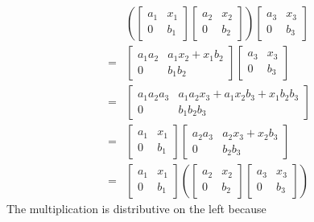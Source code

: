 \begin{align*}
  {}&
  \left(
    \begin{bmatrix}
      a_1 & x_1 \\
      0   & b_1
    \end{bmatrix}
    \begin{bmatrix}
      a_2 & x_2 \\
      0   & b_2
    \end{bmatrix}
  \right)
  \begin{bmatrix}
    a_3 & x_3 \\
    0   & b_3
  \end{bmatrix}
  \\
  ={}&
  \begin{bmatrix}
    a_1 a_2 & a_1 x_2 + x_1 b_2 \\
    0       & b_1 b_2
  \end{bmatrix}
  \begin{bmatrix}
    a_3 & x_3 \\
    0   & b_3
  \end{bmatrix}
  \\
  ={}&
  \begin{bmatrix}
    a_1 a_2 a_3 & a_1 a_2 x_3 + a_1 x_2 b_3 + x_1 b_2 b_3 \\
    0           & b_1 b_2 b_3
  \end{bmatrix}
  \\
  ={}&
  \begin{bmatrix}
      a_1 & x_1 \\
      0   & b_1
  \end{bmatrix}
  \begin{bmatrix}
    a_2 a_3 & a_2 x_3 + x_2 b_3 \\
    0       & b_2 b_3
  \end{bmatrix}
  \\
  ={}&
  \begin{bmatrix}
    a_1 & x_1 \\
    0   & b_1
  \end{bmatrix}
  \left(
    \begin{bmatrix}
      a_2 & x_2 \\
      0   & b_2
    \end{bmatrix}
    \begin{bmatrix}
      a_3 & x_3 \\
      0   & b_3
    \end{bmatrix}
  \right)
\end{align*}
The multiplication is distributive on the left because
